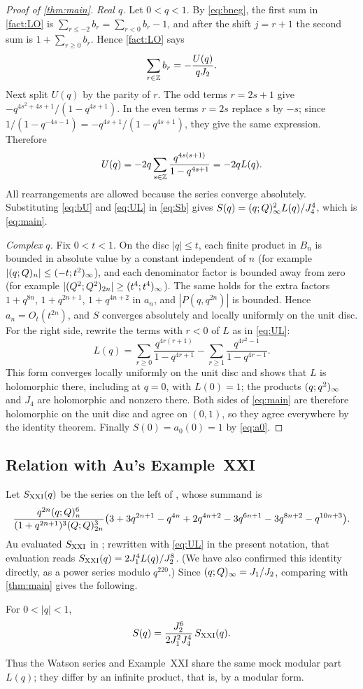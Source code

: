 \begin{proof}[Proof of \cref{thm:main}]
\emph{Real $q$.} Let $0<q<1$. By \eqref{eq:bneg}, the first sum in
\cref{fact:LO} is $\sum_{r\le-2}b_r=\sum_{r<0}b_r-1$, and after the shift
$j=r+1$ the second sum is $1+\sum_{r\ge0}b_r$. Hence \cref{fact:LO} says
\begin{equation}\label{eq:bU}
\sum_{r\in\mathbb{Z}}b_r=-\frac{U(q)}{qJ_2}.
\end{equation}
Next split $U(q)$ by the parity of $r$. The odd terms $r=2s+1$ give
$-q^{4s^2+4s+1}/(1-q^{4s+1})$. In the even terms $r=2s$ replace $s$ by $-s$;
since $1/(1-q^{-4s-1})=-q^{4s+1}/(1-q^{4s+1})$, they give the same expression.
Therefore
\begin{equation}\label{eq:UL}
U(q)=-2q\sum_{s\in\mathbb{Z}}\frac{q^{4s(s+1)}}{1-q^{4s+1}}=-2qL(q).
\end{equation}
All rearrangements are allowed because the series converge absolutely.
Substituting \eqref{eq:bU} and \eqref{eq:UL} in \eqref{eq:Sb} gives
$S(q)=(q;Q)_{\infty}^2L(q)/J_4^4$, which is \eqref{eq:main}.

\emph{Complex $q$.} Fix $0<t<1$. On the disc $|q|\le t$, each finite product in
$B_n$ is bounded in absolute value by a constant independent of $n$ (for
example $|(q;Q)_{n}|\le(-t;t^2)_{\infty}$), and each denominator
factor is bounded away from zero (for example
$|(Q^2;Q^2)_{2n}|\ge(t^4;t^4)_{\infty}$). The same holds for the extra
factors $1+q^{8n}$, $1+q^{2n+1}$, $1+q^{4n+2}$ in $a_n$, and $|P(q,q^{2n})|$ is
bounded. Hence $a_n=O_t(t^{2n})$, and $S$ converges absolutely and locally
uniformly on the unit disc. For the right side, rewrite the terms with $r<0$
of $L$ as in \eqref{eq:UL}:
\[
L(q)=\sum_{r\ge0}\frac{q^{4r(r+1)}}{1-q^{4r+1}}-\sum_{r\ge1}\frac{q^{4r^2-1}}{1-q^{4r-1}} .
\]
This form converges locally uniformly on the unit disc and shows that $L$ is
holomorphic there, including at $q=0$, with $L(0)=1$; the products
$(q;q^2)_{\infty}$ and $J_4$ are holomorphic and nonzero there. Both sides of
\eqref{eq:main} are therefore holomorphic on the unit disc and agree on
$(0,1)$, so they agree everywhere by the identity theorem. Finally $S(0)=a_0(0)=1$
by \eqref{eq:a0}.
\end{proof}

\subsection*{Relation with Au's Example~XXI}
Let $S_{\mathrm{XXI}}(q)$ be the series on the left of \cite[(3.13)]{Au}, whose summand is
\[
\frac{q^{2n}(q;Q)_{n}^6}{(1+q^{2n+1})^3(Q;Q)_{2n}^3}
\big(3+3q^{2n+1}-q^{4n}+2q^{4n+2}-3q^{6n+1}-3q^{8n+2}-q^{10n+3}\big).
\]
Au evaluated $S_{\mathrm{XXI}}$ in \cite[(3.13)]{Au}; rewritten with \eqref{eq:UL} in the
present notation, that evaluation reads $S_{\mathrm{XXI}}(q)=2J_1^4L(q)/J_2^8$. (We have
also confirmed this identity directly, as a power series modulo $q^{220}$.) Since $(q;Q)_{\infty}=J_1/J_2$, comparing with
\cref{thm:main} gives the following.

\begin{corollary}\label{cor:XXI}
For $0<|q|<1$,
\[
S(q)=\frac{J_2^6}{2J_1^2J_4^4}\,S_{\mathrm{XXI}}(q).
\]
\end{corollary}

Thus the Watson series and Example~XXI share the same mock modular part
$L(q)$; they differ by an infinite product, that is, by a modular form.
